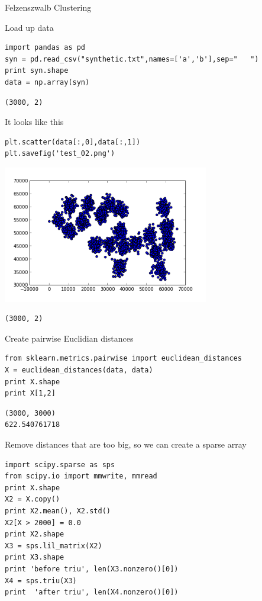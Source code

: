\documentclass[12pt,fleqn]{article}\usepackage{common}
\begin{document}
Felzenszwalb Clustering

Load up data

\begin{verbatim}
import pandas as pd
syn = pd.read_csv("synthetic.txt",names=['a','b'],sep="   ")
print syn.shape
data = np.array(syn)
\end{verbatim}

\begin{verbatim}
(3000, 2)
\end{verbatim}

It looks like this

\begin{verbatim}
plt.scatter(data[:,0],data[:,1])
plt.savefig('test_02.png')
\end{verbatim}

\includegraphics[height=6cm]{test_02.png}

\begin{verbatim}
(3000, 2)
\end{verbatim}

Create pairwise Euclidian distances

\begin{verbatim}
from sklearn.metrics.pairwise import euclidean_distances
X = euclidean_distances(data, data)
print X.shape
print X[1,2]
\end{verbatim}

\begin{verbatim}
(3000, 3000)
622.540761718
\end{verbatim}

Remove distances that are too big, so we can create a sparse array

\begin{verbatim}
import scipy.sparse as sps
from scipy.io import mmwrite, mmread
print X.shape
X2 = X.copy()
print X2.mean(), X2.std()
X2[X > 2000] = 0.0
print X2.shape
X3 = sps.lil_matrix(X2)
print X3.shape
print 'before triu', len(X3.nonzero()[0])
X4 = sps.triu(X3)
print  'after triu', len(X4.nonzero()[0])
\end{verbatim}
\end{document}
